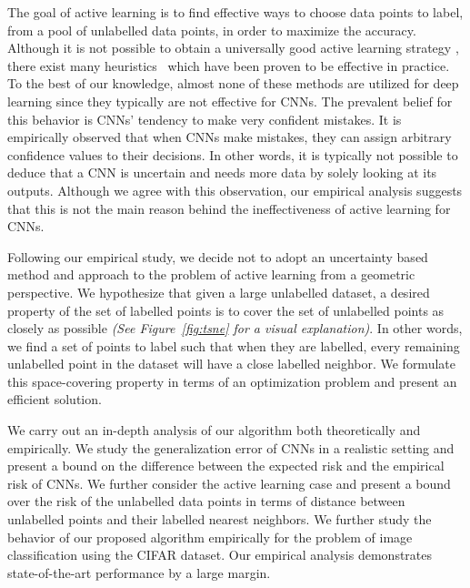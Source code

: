 \documentclass{article}
\begin{document}
The goal of active learning is to find effective ways to choose data points to label, from a pool of unlabelled data points, in order to maximize the accuracy. Although it is not possible to obtain a universally good active learning strategy \cite{dasgupta2004analysis}, there exist many heuristics~\cite{settles2010active} which have been proven to be effective in practice. To the best of our knowledge, almost none of these methods are utilized for deep learning since they typically are not effective for CNNs. The prevalent belief for this behavior is CNNs' tendency to make very confident mistakes. It is empirically observed that when CNNs make mistakes, they can assign arbitrary confidence values to their decisions. In other words, it is typically not possible to deduce that a CNN is uncertain and needs more data by solely looking at its outputs. Although we agree with this observation, our empirical analysis suggests that this is not the main reason behind the ineffectiveness of active learning for CNNs. 

Following our empirical study, we decide not to adopt an uncertainty based method and approach to the problem of active learning from a geometric perspective. We hypothesize that given a large unlabelled dataset, a desired property of the set of labelled points is to cover the set of unlabelled points as closely as possible \emph{(See Figure~\ref{fig:tsne} for a visual explanation)}. In other words, we find a set of points to label such that when they are labelled, every remaining unlabelled point in the dataset will have a close labelled neighbor. We formulate this space-covering property in terms of an optimization problem and present an efficient solution.

We carry out an in-depth analysis of our algorithm both theoretically and empirically. We study the generalization error of CNNs in a realistic setting and present a bound on the difference between the expected risk and the empirical risk of CNNs. We further consider the active learning case and present a bound over the risk of the unlabelled data points in terms of distance between unlabelled points and their labelled nearest neighbors. We further study the behavior of our proposed algorithm empirically for the problem of image classification using the CIFAR\cite{cifar} dataset. Our empirical analysis demonstrates state-of-the-art performance by a large margin. 

\end{document}
